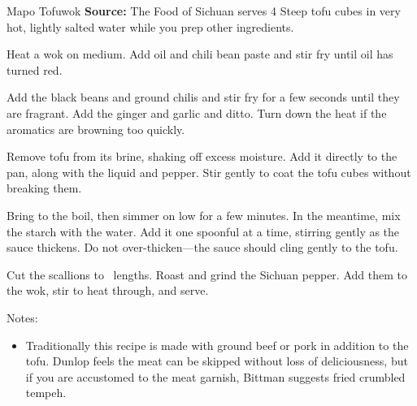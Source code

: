 \begin{recipe}{Mapo Tofu}{wok \hfill }{\textbf{Source:} The Food of Sichuan \hfill serves 4}
  Steep tofu cubes in very hot, lightly salted water while you prep other ingredients.

Heat a wok on medium. Add oil and chili bean paste and stir fry until oil has turned red.

Add the black beans and ground chilis and stir fry for a few seconds until they are fragrant. Add the ginger and garlic and ditto. Turn down the heat if the aromatics are browning too quickly.

Remove tofu from its brine, shaking off excess moisture. Add it directly to the pan, along with the liquid and pepper. Stir gently to coat the tofu cubes without breaking them.

Bring to the boil, then simmer on low for a few minutes. In the meantime, mix the starch with the water. Add it one spoonful at a time, stirring gently as the sauce thickens. Do not over-thicken---the sauce should cling gently to the tofu.

Cut the scallions to \inch\ lengths. Roast and grind the Sichuan pepper. Add them to the wok, stir to heat through, and serve.

  \freeform Notes:
  \begin{itemize}
    \item Traditionally this recipe is made with ground beef or pork in addition to the tofu. Dunlop feels the meat can be skipped without loss of deliciousness, but if you are accustomed to the meat garnish, Bittman suggests fried crumbled tempeh.
  \end{itemize}
\end{recipe}